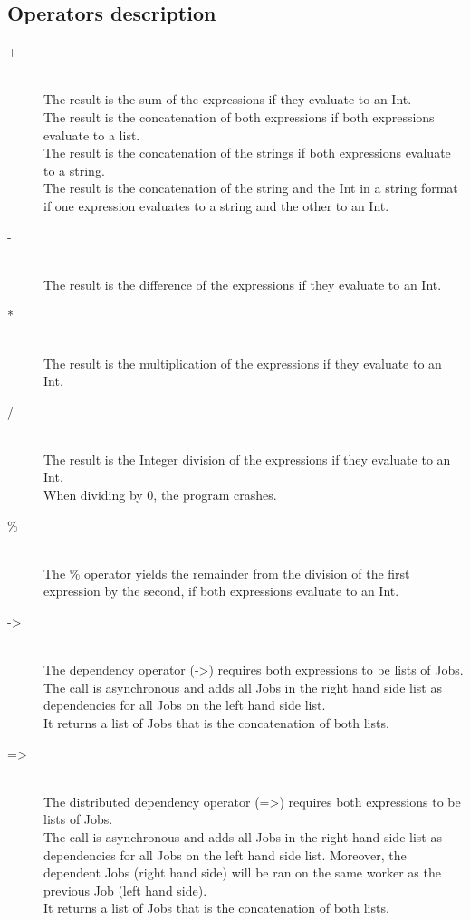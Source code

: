 \subsection{Operators description}
\begin{description}
\item[+] \hfil \\
The result is the sum of the expressions if they evaluate to an Int.\\
The result is the concatenation of both expressions if both expressions evaluate to
a list.\\
The result is the concatenation of the strings if both expressions evaluate to
a string.\\
The result is the concatenation of the string and the Int in a string format if
one expression evaluates to a string and the other to an Int.\\

\item[-] \hfil \\
The result is the difference of the expressions if they evaluate to an Int.

\item[*] \hfil \\
The result is the multiplication of the expressions if they evaluate to an Int.

\item[/] \hfil \\
The result is the Integer division of the expressions if they evaluate to an Int.\\
When dividing by 0, the program crashes.

\item[\%] \hfil \\
The \% operator yields the remainder from the division of the first expression by the second, if
both expressions evaluate to an Int.

\item[->] \hfil \\
The dependency operator (->) requires both expressions to be lists of Jobs.\\
The call is asynchronous and adds all Jobs in the right hand side list as dependencies
for all Jobs on the left hand side list.\\
It returns a list of Jobs that is the concatenation of both lists.

\item[=>] \hfil \\
The distributed dependency operator (=>) requires both expressions to be lists of Jobs.\\
The call is asynchronous and adds all Jobs in the right hand side list as dependencies
for all Jobs on the left hand side list. Moreover, the dependent Jobs (right
hand side)  will be ran on the same worker as the previous Job (left hand
side).\\
It returns a list of Jobs that is the concatenation of both lists.


\end{description}
